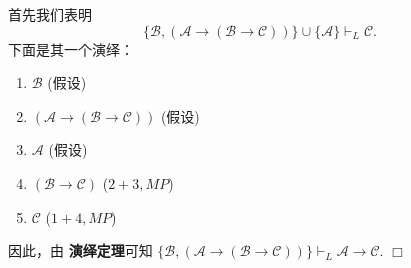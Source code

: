 \documentclass[UTF8,12pt,a4paper]{ctexart}
\begin{document}
首先我们表明
\[
\{\mathscr{B}, (\mathscr{A} \to (\mathscr{B} \to \mathscr{C}))\} \cup \{ \mathscr{A}\} \vdash_L \mathscr{C}.
\]
下面是其一个演绎：
\begin{enumerate}
	\item $\mathscr{B}$  
	\hfill (假设)
	
	\item $(\mathscr{A} \to (\mathscr{B} \to \mathscr{C}))$
	\hfill (假设)
	
	\item $\mathscr{A}$
	\hfill (假设)
	
	\item $(\mathscr{B} \to \mathscr{C})$
	\hfill ($2+3,MP$)
	
	\item $\mathscr{C}$
	\hfill ($1+4, MP$)
\end{enumerate} 

因此，由 \textbf{演绎定理}可知
$
\{\mathscr{B}, (\mathscr{A} \to (\mathscr{B} \to \mathscr{C}))\} \vdash_L \mathscr{A} \to \mathscr{C}.
$
\hfill $\Box$

\vspace{1em}
\end{document}

